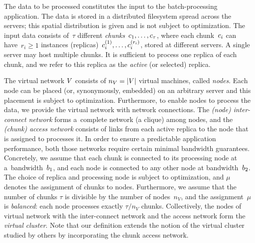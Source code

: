  The data to be processed constitutes the input to the batch-processing application.
The data is stored in a distributed filesystem spread across the servers; this spatial distribution is given and is not subject to optimization.
The input data consists of~$\tau$ different \emph{chunks}~$c_1, \ldots, c_{\tau}$,
where each chunk~$c_i$ can have~$r_i\geq 1$ instances (replicas)~$c_{i}^{(1)},\ldots, c_{i}^{(r_i)}$,
 stored at different servers. A single server may host multiple chunks.
It is sufficient to process one replica of each chunk, and we refer to this
replica as the \emph{active} (or selected) replica.

 The virtual network $V$ consists of $n_V=|V|$ virtual machines, called \emph{nodes}.
Each node can be placed (or, synonymously, embedded) on an arbitrary server and this placement is subject
to optimization.
Furthermore, to enable nodes to process the data, we provide the virtual network with network connections.
The \emph{(node) inter-connect network} forms a~complete network (a clique) among nodes,
and the \emph{(chunk) access network} consists of links from each active replica to the node that is assigned to processes it.
In order to ensure a predictable application performance, both those networks require certain minimal bandwidth guarantees.
Concretely, we assume that each chunk
is connected to its processing node at a~bandwidth~$b_1$, and each node is connected to any other node
at  bandwidth~$b_2$.
The choice of replica and processing node is subject to optimization, and
$\mu$ denotes the assignment of chunks to nodes.
Furthermore, we assume that the number of chunks $\tau$ is divisible by the number of nodes~$n_V$, and the assignment~$\mu$ is \emph{balanced}:
each node processes exactly $\tau / n_V$ chunks.
Collectively, the nodes of virtual network with the inter-connect network and the access network form the \emph{virtual cluster}.
Note that our definition extends the notion of the virtual cluster studied by others \cite{oktopus,talk-about,infocom16,ccr15emb,proteus} by incorporating the chunk access network.


